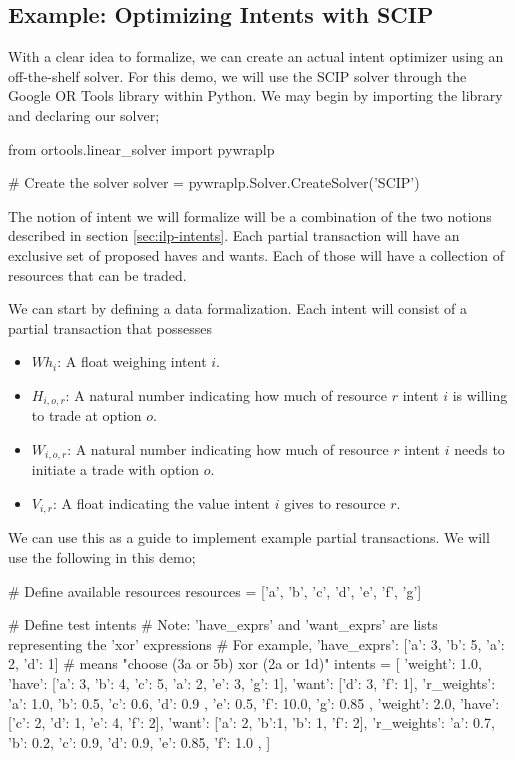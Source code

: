 
\subsection{Example: Optimizing Intents with SCIP}\label{sec:scip-example}

With a clear idea to formalize, we can create an actual intent optimizer using an off-the-shelf solver. For this demo, we will use the SCIP solver through the Google OR Tools library within Python. We may begin by importing the library and declaring our solver;

\begin{betterpython}
from ortools.linear_solver import pywraplp

# Create the solver
solver = pywraplp.Solver.CreateSolver('SCIP')
\end{betterpython}

The notion of intent we will formalize will be a combination of the two notions described in section \ref{sec:ilp-intents}. Each partial transaction will have an exclusive set of proposed haves and wants. Each of those will have a collection of resources that can be traded.

We can start by defining a data formalization. Each intent will consist of a partial transaction that possesses

\begin{itemize}
    \item $Wh_i$: A float weighing intent $i$.
    \item $H_{i, o, r}$: A natural number indicating how much of resource $r$ intent $i$ is willing to trade at option $o$.
    \item $W_{i, o, r}$: A natural number indicating how much of resource $r$ intent $i$ needs to initiate a trade with option $o$.
    \item $V_{i, r}$: A float indicating the value intent $i$ gives to resource $r$.
\end{itemize}

We can use this as a guide to implement example partial transactions. We will use the following in this demo;

\begin{betterpython}
# Define available resources
resources = ['a', 'b', 'c', 'd', 'e', 'f', 'g']

# Define test intents
# Note: 'have_exprs' and 'want_exprs' are lists representing the 'xor' expressions
# For example, 'have_exprs': [{'a': 3, 'b': 5}, {'a': 2, 'd': 1}] 
# means "choose (3a or 5b) xor (2a or 1d)"
intents = [
    {'weight': 1.0, 
     'have': [{'a': 3, 'b': 4, 'c': 5}, {'a': 2}, {'e': 3, 'g': 1}],
     'want': [{'d': 3}, {'f': 1}],
     'r_weights': { 'a': 1.0, 'b': 0.5, 'c': 0.6, 'd': 0.9
                  , 'e': 0.5, 'f': 10.0, 'g': 0.85}
     },
    {'weight': 2.0, 
     'have': [{'c': 2, 'd': 1}, {'e': 4}, {'f': 2}],
     'want': [{'a': 2, 'b':1}, {'b': 1, 'f': 2}],
     'r_weights': { 'a': 0.7, 'b': 0.2, 'c': 0.9, 'd': 0.9, 'e': 0.85, 'f': 1.0}
    },
]
\end{betterpython}

